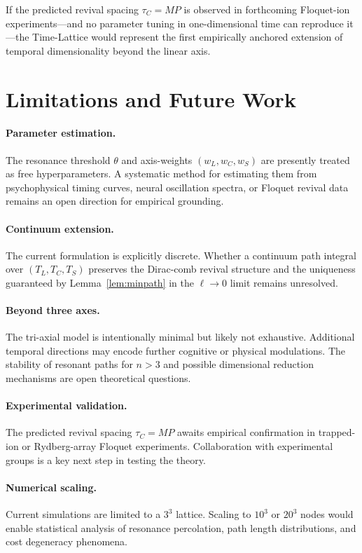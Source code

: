 \documentclass[11pt]{article}
\begin{document}
If the predicted revival spacing $\tau_C=MP$ is observed in forthcoming
Floquet-ion experiments—and no parameter tuning in one-dimensional time
can reproduce it—the Time-Lattice would represent the first empirically
anchored extension of temporal dimensionality beyond the linear axis.

\section{Limitations and Future Work}\label{sec:limits}

\paragraph{Parameter estimation.}
The resonance threshold $\theta$ and axis-weights $(w_L, w_C, w_S)$ are presently treated as free hyperparameters. A systematic method for estimating them from psychophysical timing curves, neural oscillation spectra, or Floquet revival data remains an open direction for empirical grounding.

\paragraph{Continuum extension.}
The current formulation is explicitly discrete. Whether a continuum path integral over $(T_L, T_C, T_S)$ preserves the Dirac-comb revival structure and the uniqueness guaranteed by Lemma~\ref{lem:minpath} in the $\ell \to 0$ limit remains unresolved.

\paragraph{Beyond three axes.}
The tri-axial model is intentionally minimal but likely not exhaustive. Additional temporal directions may encode further cognitive or physical modulations. The stability of resonant paths for $n > 3$ and possible dimensional reduction mechanisms are open theoretical questions.

\paragraph{Experimental validation.}
The predicted revival spacing $\tau_C = MP$ awaits empirical confirmation in trapped-ion or Rydberg-array Floquet experiments. Collaboration with experimental groups is a key next step in testing the theory.

\paragraph{Numerical scaling.}
Current simulations are limited to a $3^3$ lattice. Scaling to $10^3$ or $20^3$ nodes would enable statistical analysis of resonance percolation, path length distributions, and cost degeneracy phenomena.
\end{document}
